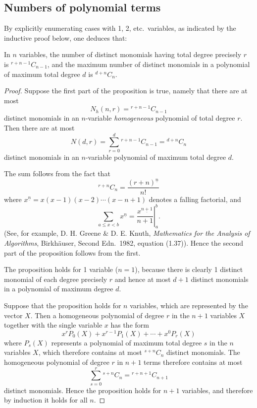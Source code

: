 \subsection{Numbers of polynomial terms}

By explicitly enumerating cases with 1, 2, etc.\ variables, as
indicated by the inductive proof below, one deduces that:

\begin{prop}
  In $n$ variables, the number of distinct monomials having total
  degree precisely $r$ is $^{r+n-1}C_{n-1}$, and the maximum number of
  distinct monomials in a polynomial of maximum total degree $d$ is
  $^{d+n}C_n$.
\end{prop}

\begin{proof}
  Suppose the first part of the proposition is true, namely that there
  are at most
  \[
    N_h(n,r) = {}^{r+n-1}C_{n-1}
  \]
  distinct monomials in an $n$-variable {\em homogeneous\/}
  polynomial of total degree $r$.  Then there are at most
  \[
    N(d,r) = \sum_{r=0}^d {}^{r+n-1}C_{n-1} = {}^{d+n}C_n
  \]
  distinct monomials in an $n$-variable polynomial of maximum total
  degree $d$.

  The sum follows from the fact that
  \[
    {}^{r+n}C_n = \frac{(r+n)^{\underline n}}{n!}
  \]
  where $x^{\underline n} = x(x-1)(x-2)\cdots(x-n+1)$ denotes a
  falling factorial, and
  \[
    \sum_{a \leq x < b} x^{\underline n} =
    \left. \frac{x^{\underline{n+1}}}{n+1} \right|_a^b.
  \]
  (See, for example, D. H. Greene \& D. E. Knuth, {\it Mathematics
  for the Analysis of Algorithms}, Birkh\"auser, Second Edn.\ 1982,
  equation (1.37)).  Hence the second part of the proposition follows
  from the first.

  The proposition holds for 1 variable ($n = 1$), because there is
  clearly 1 distinct monomial of each degree precisely $r$ and hence
  at most $d+1$ distinct monomials in a polynomial of maximum degree
  $d$.

  Suppose that the proposition holds for $n$ variables, which are
  represented by the vector $X$.  Then a homogeneous polynomial of
  degree $r$ in the $n+1$ variables $X$ together with the single
  variable $x$ has the form
  \[
    x^r P_0(X) + x^{r-1} P_1(X) + \cdots + x^0 P_r(X)
  \]
  where $P_s(X)$ represents a polynomial of maximum total degree $s$
  in the $n$ variables $X$, which therefore contains at most
  $^{s+n}C_n$ distinct monomials.  The homogeneous polynomial of
  degree $r$ in $n+1$ terms therefore contains at most
  \[
    \sum_{s=0}^r {}^{s+n}C_n = {}^{r+n+1}C_{n+1}
  \]
  distinct monomials.
  Hence the proposition holds for $n+1$ variables, and therefore by
  induction it holds for all $n$.
\end{proof}


